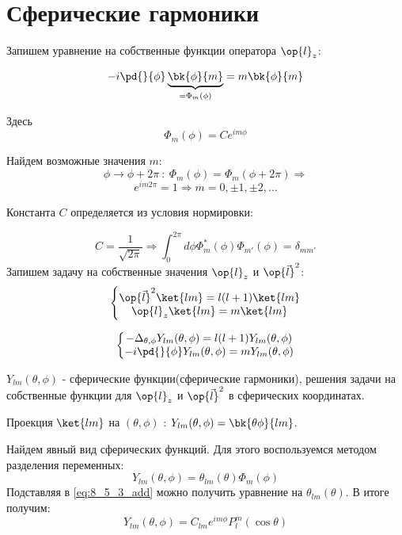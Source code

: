 \section{Сферические гармоники}

Запишем уравнение на собственные функции оператора $\op{l}_z$:

\begin{equation}
\label{eq:8_5_1}
-i \pd{}{\phi} \underbrace{\bk{\phi}{m}}_{=\Phi_m(\phi)} = m \bk{\phi}{m}
\end{equation}

Здесь 
\begin{equation}
\label{eq:8_5_2}
  \Phi_m(\phi) = C e^{i m \phi}
\end{equation}

Найдем возможные значения $m$:
$$
\phi \to \phi + 2\pi ~:~\Phi_m(\phi) = \Phi_m(\phi + 2\pi) \Rightarrow 
$$
$$
e^{im2\pi} = 1 \Rightarrow \boxed{m=0, \pm 1, \pm 2, ...}
$$

Константа $C$ определяется из условия нормировки:

$$
C = \frac{1}{\sqrt{2\pi}} \Rightarrow \int_0^{2\pi} d\phi \Phi^*_m(\phi) \Phi_{m'}(\phi) = \delta_{mm'} 
$$
Запишем задачу на собственные значения $\op{l}_z$ и $\op{\vec l}^2$:
\begin{equation}
\label{eq:8_5_3}
\left\{
  \begin{matrix}
    \op{\vec{l}}^2 \ket{lm} = l(l+1)\ket{lm} \\
    \op{l}_z \ket{lm} = m \ket{lm}
  \end{matrix}
\right.
\end{equation}


\begin{equation}
\left\{
  \begin{matrix}
  \label{eq:8_5_3_add}
   - \Delta_{\theta, \phi} Y_{lm}(\theta, \phi) = l(l+1) Y_{lm}(\theta, \phi) 
    \\
     -i\pd{}{\phi} Y_{lm}(\theta, \phi) = m Y_{lm}(\theta, \phi) 
  \end{matrix}
\right .
\end{equation}
  
$Y_{lm}(\theta, \phi)$ - сферические функции(сферические гармоники), решения задачи на собственные функции для $\op{l}_z$ и $\op{\vec l}^2$ в сферических координатах.

Проекция $\ket{lm}$ на $(\theta, \phi)$ : $Y_{lm}(\theta, \phi) = \bk{\theta \phi}{lm}$.

Найдем явный вид сферических функций. Для этого воспользуемся методом разделения переменных:
$$
Y_{lm}(\theta, \phi) = \theta_{lm}(\theta) \Phi_m(\phi)
$$
Подставляя в \eqref{eq:8_5_3_add} можно получить уравнение на $\theta_{lm}(\theta)$. В итоге получим:
$$
\boxed{Y_{lm}(\theta, \phi) = C_{lm} e^{im\phi} P^m_l(\cos \theta)}
$$

